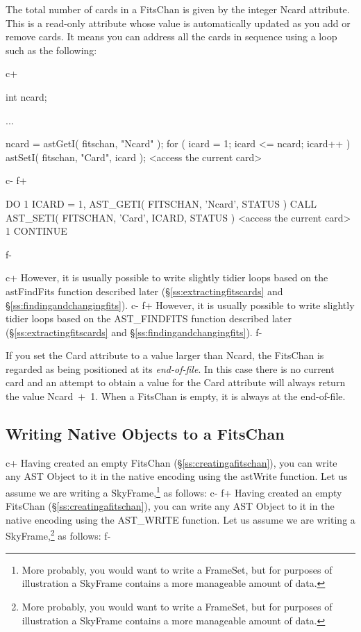 \documentclass[twoside,11pt]{starlink}
\providecommand{\secref}[1]{\S\ref{#1}}
\begin{document}
{The total number of cards in a FitsChan is given by the integer Ncard
attribute. This is a read-only attribute whose value is automatically
updated as you add or remove cards. It means you can address all the
cards in sequence using a loop such as the following:

c+
\small
\begin{terminalv}
int ncard;

...

ncard = astGetI( fitschan, "Ncard" );
for ( icard = 1; icard <= ncard; icard++ ) {
   astSetI( fitschan, "Card", icard );
   <access the current card>
}
\end{terminalv}
\normalsize
c-
f+
\small
\begin{terminalv}
      DO 1 ICARD = 1, AST_GETI( FITSCHAN, 'Ncard', STATUS )
         CALL AST_SETI( FITSCHAN, 'Card', ICARD, STATUS )
         <access the current card>
 1    CONTINUE
\end{terminalv}
\normalsize
f-

c+
However, it is usually possible to write slightly tidier loops based
on the astFindFits function described later
(\secref{ss:extractingfitscards} and
\secref{ss:findingandchangingfits}).
c-
f+
However, it is usually possible to write slightly tidier loops based
on the AST\_FINDFITS function described later
(\secref{ss:extractingfitscards} and
\secref{ss:findingandchangingfits}).
f-

If you set the Card attribute to a value larger than Ncard, the
FitsChan is regarded as being positioned at its \emph{end-of-file}. In
this case there is no current card and an attempt to obtain a value
for the Card attribute will always return the value Ncard~$+$~1. When
a FitsChan is empty, it is always at the end-of-file.

\subsection{\label{ss:writingnativefits}Writing Native Objects to a FitsChan}

c+
Having created an empty FitsChan (\secref{ss:creatingafitschan}), you
can write any AST Object to it in the native encoding using the
astWrite function. Let us assume we are writing a
SkyFrame,\footnote{More probably, you would want to write a FrameSet,
but for purposes of illustration a SkyFrame contains a more manageable
amount of data.} as follows:
c-
f+
Having created an empty FitsChan (\secref{ss:creatingafitschan}), you
can write any AST Object to it in the native encoding using the
AST\_WRITE function. Let us assume we are writing a
SkyFrame,\footnote{More probably, you would want to write a FrameSet,
but for purposes of illustration a SkyFrame contains a more manageable
amount of data.} as follows:
f-

}
\end{document}
